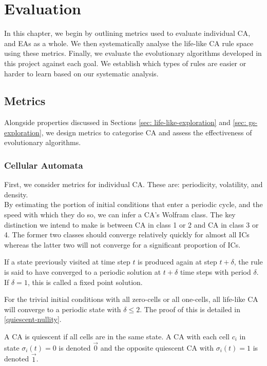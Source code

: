 \chapter{Evaluation} \label{evaluation}

In this chapter, we begin by outlining metrics used to evaluate individual CA, and EAs as a whole. We then systematically analyse the life-like CA rule space using these metrics. Finally, we evaluate the evolutionary algorithms developed in this project against each goal. We establish which types of rules are easier or harder to learn based on our systematic analysis. 

\section{Metrics}
Alongside properties discussed in Sections \ref{sec: life-like-exploration} and \ref{sec: gs-exploration}, we design metrics to categorise CA and assess the effectiveness of evolutionary algorithms.

\subsection{Cellular Automata}
First, we consider metrics for individual CA. These are: periodicity, volatility, and density.\\

By estimating the portion of initial conditions that enter a periodic cycle, and the speed with which they do so, we can infer a CA's Wolfram class. The key distinction we intend to make is between CA in class 1 or 2 and CA in class 3 or 4. The former two classes should converge relatively quickly for almost all ICs whereas the latter two will not converge for a significant proportion of ICs.

\begin{definition}
 If a state previously visited at time step $t$ is produced again at step $t+\delta$, the rule is said to have converged to a periodic solution at $t+\delta$ time steps with period $\delta$. If $\delta = 1$, this is called a fixed point solution. 
\end{definition}

For the trivial initial conditions with all zero-cells or all one-cells, all life-like CA will converge to a periodic state with $\delta \leq 2$. The proof of this is detailed in \ref{quiescent-nullity}.

\begin{definition}[Quiescence]
A CA is quiescent if all cells are in the same state. A CA with each cell $c_i$ in state $\sigma_i(t) = 0$ is denoted $\vec{0}$ and the opposite quiescent CA with $\sigma_i(t) = 1$ is denoted $\vec{1}$. 
\end{definition}

